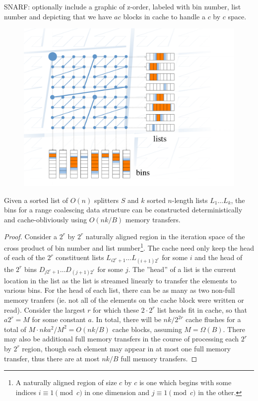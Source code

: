 SNARF: optionally include a graphic of z-order, labeled with bin number, list number
and depicting that we have $ac$ blocks in cache to handle a $c$ by $c$ space.

\begin{figure}[h]
\includegraphics[scale=.35]{bin-construction.pdf}
\caption{}
\label{fig:range_coalescing} 
\end{figure}


\begin{theorem}
Given a sorted list of $O(n)$ splitters $S$ and $k$ sorted $n$-length lists 
$L_1 \ldots L_k$, the bins for a range coalescing data structure can be constructed
deterministically and cache-obliviously using $O(nk/B)$ memory transfers.
\end{theorem}

\begin{proof}
Consider a $2^r$ by $2^r$ naturally aligned region in the iteration space of the
cross product of bin number and list number\footnote{A naturally aligned region
of size $c$ by $c$ is one which begins with some indices $i \equiv 1 \pmod{c}$ 
in one dimension and $j \equiv 1 \pmod{c}$ in the other.}.  
The cache need only keep the head of each of the $2^r$ constituent
lists $L_{i2^r + 1} \ldots L_{(i+1)2^r}$ for some $i$ and the head of the $2^r$ bins 
$D_{j2^r + 1} \ldots D_{(j+1)2^r}$ for some $j$. 
The ''head'' of a list is the current location
in the list as the list is streamed linearly to transfer the elements to various bins.  
For the head of each list, there can be as many as
two non-full memory tranfers (ie. not all of the elements on the cache block were
written or read).  Consider the largest $r$ for which these $2 \cdot 2^r$ list heads
fit in cache, so that $a2^r = M$ for some constant $a$.  In total, there will be 
$nk/2^{2r}$ cache flushes for a total of $M \cdot nka^2/M^2 = O(nk/B)$ cache blocks, 
assuming $M = \Omega(B)$.  There may also be additional full memory transfers in the
course of processing each $2^r$ by $2^r$ region, though
each element may appear in at most one full memory transfer, thus there are at most
$nk/B$ full memory transfers.  
\end{proof}


